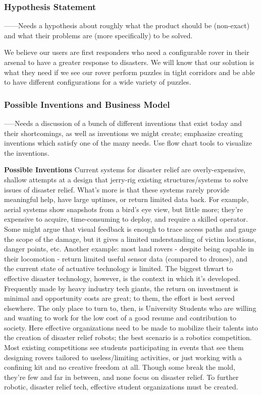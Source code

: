 \documentclass[a4paper, 10pt]{article}
\begin{document}
		\subsubsection{Hypothesis Statement}
		------Needs a hypothesis about roughly what the product should be (non-exact) and what their problems are (more specifically) to be solved. 
		
		We believe our users are first responders who need a configurable rover in their arsenal to have a greater response to disasters. We will know that our solution is what they need if we see our rover perform puzzles in tight corridors and be able to have different configurations for a wide variety of puzzles.

		\subsubsection{Possible Inventions and Business Model}
		-----Needs a discussion of a bunch of different inventions that exist today and their shortcomings,  as  well as inventions we might create; emphasize creating inventions which satisfy one of the many needs. Use flow chart tools to visualize the inventions. 
				
		\textbf{Possible Inventions}
		Current systems for disaster relief are overly-expensive, shallow attempts at a design that jerry-rig existing structures/systems to solve issues of disaster relief. What’s more is that these systems rarely provide meaningful help, have large uptimes, or return limited data back. For example, aerial systems show snapshots from a bird's eye view, but little more; they're expensive to acquire, time-consuming to deploy, and require a skilled operator. Some might argue that visual feedback is enough to trace access paths and gauge the scope of the damage, but it gives a limited understanding of victim locations, danger points, etc. Another example: most land rovers - despite being capable in their locomotion - return limited useful sensor data (compared to drones), and the current state of actuative technology is limited. The biggest thwart to effective disaster technology, however, is the context in which it's developed. Frequently made by heavy industry tech giants, the return on investment is minimal and opportunity costs are great; to them, the effort is best served elsewhere. The only place to turn to, then, is University Students who are willing and wanting to work for the low cost of a good resume and contribution to society. Here effective organizations need to be made to mobilize their talents into the creation of disaster relief robots; the best scenario is a robotics competition. Most existing competitions see students participating in events that see them designing rovers tailored to useless/limiting activities, or just working with a confining kit and no creative freedom at all. Though some break the mold, they're few and far in between, and none focus on disaster relief. To further robotic, disaster relief tech, effective student organizations must be created.
		
\end{document}
